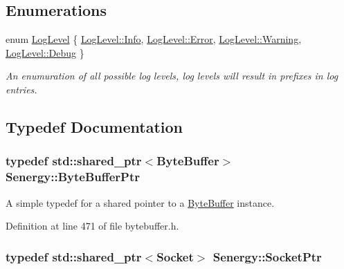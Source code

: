 \subsection*{Enumerations}
\begin{DoxyCompactItemize}
\item 
enum \hyperlink{namespace_senergy_a8a440a300c8ecafb12b81c1853a5c66d}{Log\-Level} \{ \hyperlink{namespace_senergy_a8a440a300c8ecafb12b81c1853a5c66da4059b0251f66a18cb56f544728796875}{Log\-Level\-::\-Info}, 
\hyperlink{namespace_senergy_a8a440a300c8ecafb12b81c1853a5c66da902b0d55fddef6f8d651fe1035b7d4bd}{Log\-Level\-::\-Error}, 
\hyperlink{namespace_senergy_a8a440a300c8ecafb12b81c1853a5c66da0eaadb4fcb48a0a0ed7bc9868be9fbaa}{Log\-Level\-::\-Warning}, 
\hyperlink{namespace_senergy_a8a440a300c8ecafb12b81c1853a5c66daa603905470e2a5b8c13e96b579ef0dba}{Log\-Level\-::\-Debug}
 \}
\begin{DoxyCompactList}\small\item\em An enumuration of all possible log levels, log levels will result in prefixes in log entries. \end{DoxyCompactList}\end{DoxyCompactItemize}


\subsection{Typedef Documentation}
\hypertarget{namespace_senergy_a30f5cfaeb333ffdf2c3332cc590a57ea}{
\subsubsection[{Byte\-Buffer\-Ptr}]{\setlength{\rightskip}{0pt plus 5cm}typedef std\-::shared\-\_\-ptr$<${\bf Byte\-Buffer}$>$ {\bf Senergy\-::\-Byte\-Buffer\-Ptr}}}\label{namespace_senergy_a30f5cfaeb333ffdf2c3332cc590a57ea}


A simple typedef for a shared pointer to a \hyperlink{class_senergy_1_1_byte_buffer}{Byte\-Buffer} instance. 



Definition at line 471 of file bytebuffer.\-h.

\hypertarget{namespace_senergy_a9014e48a368555ba932efd8d17eb2d23}{
\subsubsection[{Socket\-Ptr}]{\setlength{\rightskip}{0pt plus 5cm}typedef std\-::shared\-\_\-ptr$<${\bf Socket}$>$ {\bf Senergy\-::\-Socket\-Ptr}}}\label{namespace_senergy_a9014e48a368555ba932efd8d17eb2d23}


